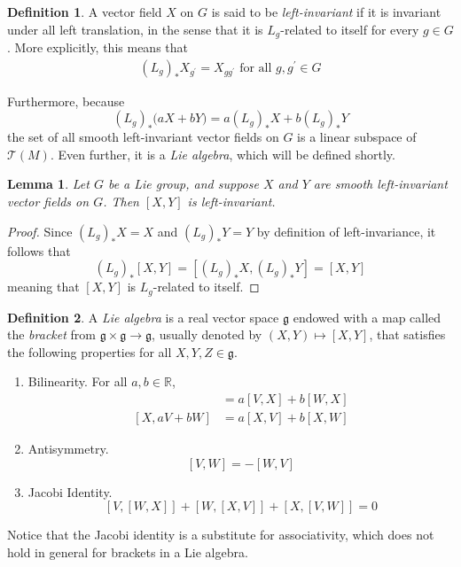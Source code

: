 \documentclass{article}
\newtheorem{lemma}[theorem]{Lemma}
\theoremstyle{remark}
\theoremstyle{definition}
\newtheorem{definition}{Definition}[section]
\begin{document}
\begin{definition}
A vector field $X$ on $G$ is said to be \textit{left-invariant} if it is invariant under all left translation, in the sense that it is $L_g$-related to itself for every $g \in G$. More explicitly, this means that
\begin{align*}
    (L_g)_* X_{g^\prime} = X_{g g^\prime} \text{ for all } g, g^\prime \in G
\end{align*}
\end{definition}

Furthermore, because
\[(L_g)_* \big( a X + b Y \big) = a (L_g)_* X + b (L_g)_* Y\]
the set of all smooth left-invariant vector fields on $G$ is a linear subspace of $\mathcal{T}(M)$. Even further, it is a \textit{Lie algebra}, which will be defined shortly.  

\begin{lemma}
Let $G$ be a Lie group, and suppose $X$ and $Y$ are smooth left-invariant vector fields on $G$. Then $[X, Y]$ is left-invariant. 
\end{lemma}
\begin{proof}
Since $(L_g)_* X = X$ and $(L_g)_* Y = Y$ by definition of left-invariance, it follows that
\[(L_g)_* [X,Y] = [(L_g)_* X, (L_g)_* Y] = [X,Y]\]
meaning that $[X, Y]$ is $L_g$-related to itself. 
\end{proof}

\begin{definition}
A \textit{Lie algebra} is a real vector space $\mathfrak{g}$ endowed with a map called the \textit{bracket} from $\mathfrak{g} \times \mathfrak{g} \longrightarrow \mathfrak{g}$, usually denoted by $(X, Y) \mapsto [X, Y]$, that satisfies the following properties for all $X, Y, Z \in \mathfrak{g}$. 
\begin{enumerate}
    \item Bilinearity. For all $a, b \in \mathbb{R}$, 
    \begin{align*}
        [a V + b W, X] & = a [V, X] + b [W, X] \\
        [X, a V + b W] & = a [X, V] + b [X, W]
    \end{align*}
    \item Antisymmetry.
    \[[V, W] = - [W, V]\]
    \item Jacobi Identity. 
    \[[V,[W,X]] + [W,[X,V]] + [X,[V,W]] = 0\]
\end{enumerate}
Notice that the Jacobi identity is a substitute for associativity, which does not hold in general for brackets in a Lie algebra. 
\end{definition}
\end{document}
